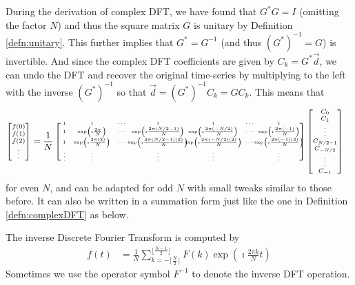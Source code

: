 During the derivation of complex DFT, we have found that $G^*G = I$ (omitting the factor $N$) and thus the square matrix $G$ is unitary by Definition \ref{defn:unitary}. This further implies that $G^* = G^{-1}$ (and thus $(G^*)^{-1} = G$) is invertible. And since the complex DFT coefficients are given by $C_k = G^*\vec{d}$, we can undo the DFT and recover the original time-series by multiplying to the left with the inverse $(G^*)^{-1}$ so that $\vec{d} = (G^*)^{-1}C_k = G C_k$. This means that
\begin{align*}
\scriptsize
\begin{bmatrix}
f(0) \\
f(1) \\
f(2) \\
\vdots
\end{bmatrix}    
&= 
\frac{1}{N}
\tiny
\left[\begin{array}{@{\,}wc{6pt}wc{36pt}wc{10pt}wc{52pt}wc{52pt}wc{10pt}wc{36pt}}
1 & 1 & \cdots & 1 & 1 & \cdots & 1 \\
1 & \exp(\imath\frac{2\pi}{N}) & \cdots & \exp(\imath\frac{2\pi(N/2-1)}{N}) & \exp(\imath\frac{2\pi(-N/2)}{N}) & \cdots & \exp(\imath\frac{2\pi(-1)}{N}) \\
1 & \exp(\imath\frac{2\pi(2)}{N}) & \cdots & \exp(\imath\frac{2\pi(N/2-1)(2)}{N}) & \exp(\imath\frac{2\pi(-N/2)(2)}{N}) & \cdots & \exp(\imath\frac{2\pi(-1)(2)}{N}) \\
\vdots & \vdots &  & \vdots & \vdots & & \vdots \\
\end{array}\right]
\scriptsize
\begin{bmatrix}
C_0 \\
C_1 \\
\vdots \\
C_{N/2-1} \\
C_{-N/2} \\
\vdots \\
C_{-1}
\end{bmatrix}
\end{align*}
for even $N$, and can be adapted for odd $N$ with small tweaks similar to those before. It can also be written in a summation form just like the one in Definition \ref{defn:complexDFT} as below.
\begin{defn}
\label{defn:iDFT}
The inverse Discrete Fourier Transform is computed by
\begin{align*}
f(t) &= \frac{1}{N}\sum_{k= -\lfloor \frac{N}{2} \rfloor}^{\lfloor \frac{N-1}{2} \rfloor} F(k)\exp(\imath\frac{2\pi k}{N}t)
\end{align*}
Sometimes we use the operator symbol $F^{-1}$ to denote the inverse DFT operation.
\end{defn}
